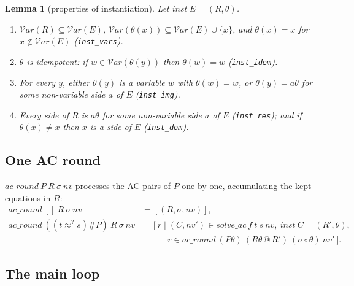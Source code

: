 \documentclass[11pt,a4paper]{article}
\newtheorem{lemma}[theorem]{Lemma}
\theoremstyle{definition}
\theoremstyle{remark}
\newcommand{\isa}[1]{\mbox{\small\texttt{#1}}}
\newcommand{\vars}{\mathcal{V}\mathit{ar}}
\begin{document}
\begin{lemma}[properties of instantiation]\label{lem:inst}
  Let $\mathit{inst}\ E = (R, \theta)$.
  \begin{enumerate}[nosep]
    \item $\vars(R) \subseteq \vars(E)$, $\vars(\theta(x)) \subseteq \vars(E) \cup \{x\}$, and
          $\theta(x) = x$ for $x \notin \vars(E)$ (\isa{inst\_vars}).
    \item $\theta$ is idempotent: if $w \in \vars(\theta(y))$ then $\theta(w) = w$
          (\isa{inst\_idem}).
    \item For every $y$, either $\theta(y)$ is a variable $w$ with $\theta(w) = w$, or
          $\theta(y) = a\theta$ for some non-variable side $a$ of $E$ (\isa{inst\_img}).
    \item Every side of $R$ is $a\theta$ for some non-variable side $a$ of $E$ (\isa{inst\_res});
          and if $\theta(x) \neq x$ then $x$ is a side of $E$ (\isa{inst\_dom}).
  \end{enumerate}
\end{lemma}

\subsection{One AC round}

$\mathit{ac\_round}\ P\ R\ \sigma\ \mathit{nv}$ processes the AC pairs of $P$ one by one,
accumulating the kept equations in $R$:
\begin{align*}
  \mathit{ac\_round}\ []\ R\ \sigma\ \mathit{nv} &= [(R, \sigma, \mathit{nv})],\\
  \mathit{ac\_round}\ ((t \approx^? s) \# P)\ R\ \sigma\ \mathit{nv}
    &= \bigl[\ r \mid (C, \mathit{nv}') \in \mathit{solve\_ac}\ f\ t\ s\ \mathit{nv},\
       \mathit{inst}\ C = (R', \theta),\\
    &\qquad\quad r \in \mathit{ac\_round}\ (P\theta)\ (R\theta \mathbin{@} R')\
       (\sigma\circ\theta)\ \mathit{nv}' \ \bigr].
\end{align*}

\subsection{The main loop}
\end{document}
